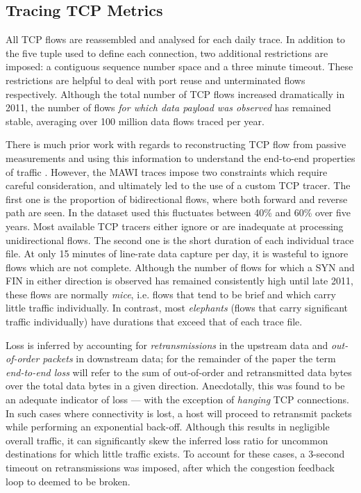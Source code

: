 \subsection{Tracing \acs{TCP} Metrics}

All \ac{TCP} flows are reassembled and analysed for each daily trace.
In addition to the five tuple used to define each connection, two additional restrictions are imposed: a contiguous sequence number space and a three minute timeout. 
These restrictions are helpful to deal with port reuse and unterminated flows respectively.  
Although the total number of \ac{TCP} flows increased dramatically in 2011, the number of flows \emph{for which data payload was observed} has remained stable, averaging over 100 million data flows traced per year.  

There is much prior work with regards to reconstructing \ac{TCP} flow from passive measurements and using this information to understand the end-to-end properties of traffic \cite{firstRTT,Jaiswal:2007p233,Rewaskar:2007p195,Shakkottai:2004p408}. 
However, the \acs{MAWI} traces impose two constraints which require careful consideration, and ultimately led to the use of a custom \ac{TCP} tracer. 
The first one is the proportion of bidirectional flows, where both forward and reverse path are seen. 
In the dataset used this fluctuates between 40\% and 60\% over five years.
Most available \ac{TCP} tracers either ignore or are inadequate at processing unidirectional flows. 
The second one is the short duration of each individual trace file. 
At only 15 minutes of line-rate data capture per day, it is wasteful to ignore flows which are not complete. 
Although the number of flows for which a SYN and FIN in either direction is observed has remained consistently high until late 2011, these flows are normally \emph{mice}, i.e. flows that tend to be brief and which carry little traffic individually. 
In contrast, most \emph{elephants} (flows that carry significant traffic individually) have durations that exceed that of each trace file. 

Loss is inferred by accounting for \emph{retransmissions} in the upstream data and \emph{out-of-order packets} in downstream data; for the remainder of the paper the term \emph{end-to-end loss} will refer to the sum of out-of-order and retransmitted data bytes over the total data bytes in a given direction.
Anecdotally, this was found to be an adequate indicator of loss --- with the exception of \emph{hanging} \ac{TCP} connections. 
In such cases where connectivity is lost, a host will proceed to retransmit packets while performing an exponential back-off. 
Although this results in negligible overall traffic, it can significantly skew the inferred loss ratio for uncommon destinations for which little traffic exists. 
To account for these cases, a 3-second timeout on retransmissions was imposed, after which the congestion feedback loop to deemed to be broken. 

